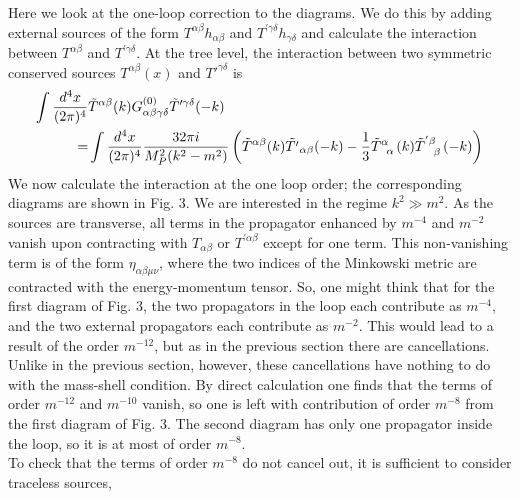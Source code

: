 \documentclass{book}
\theoremstyle{definition}
\newcommand{\nn}{\nonumber}
\newcommand{\al}{\alpha}
\newcommand{\be}{\beta}
\newcommand{\f}[2]{\frac{#1}{#2}}
\newcommand{\lp}{\left(}
\newcommand{\rp}{\right)}
\begin{document}
\begin{framed}
	Here we look at the one-loop correction to the diagrams. We do this by adding external sources of the form $T^{\al\be}h_{\al\be}$ and $T^{'\gamma\delta}h_{\gamma\delta}$ and calculate the interaction between $T^{\al\be}$ and $T^{'\gamma\delta}$. At the tree level, the interaction between two symmetric conserved
	sources $T^{\al\be}(x)$ and $T'^{\gamma\delta}$ is 
	\begin{align}
	\int\f{d^4x}{(2\pi)^4}&\tilde T^{\al\beta}(k) G^{(0)}_{\al\be\gamma\delta}\tilde T'^{\gamma\delta}(-k)\nn\\
	= &\int\f{d^4x}{(2\pi)^4} \f{32\pi i}{M_P^2 (k^2 - m^2)} \lp \tilde{T}^{\al\be}(k)\tilde{T'}_{\al\be}(-k)  - \f{1}{3}\tensor{\tilde{T}}{^\al_\al}(k)\tensor{\tilde{T}}{^{'\be}_\be}(-k)\rp
	\end{align} 
	We now calculate the interaction at the one loop order; the corresponding diagrams are shown in Fig. 3. We are interested in the regime $k^2 \gg m^2$. As the sources are transverse, all terms in the propagator enhanced by
	$m^{-4}$ and $m^{-2}$ vanish upon contracting with $T_{\al\be}$ or $T^{'\al\be}$ except for one term.
	This non-vanishing term is of the form $\eta_{\al\be\mu\nu}$, where the two indices of
	the Minkowski metric are contracted with the energy-momentum tensor. So, one might think that for the first diagram of Fig. 3, the two propagators
	in the loop each contribute as $m^{-4}$, and the two external propagators each contribute as $m^{-2}$. This would lead to a result of the order $m^{-12}$, but as in the previous section there are cancellations. Unlike in the previous section, however, these cancellations have nothing to do with the mass-shell condition. By direct calculation one finds that the terms of order $m^{-12}$ and
	$m^{-10}$ vanish, so one is left with contribution of order $m^{-8}$ from the first diagram of Fig. 3. The second diagram has only one propagator inside the
	loop, so it is at most of order $m^{-8}$.\\
	
	To check that the terms of order $m^{-8}$ do not cancel out, it is sufficient to consider traceless sources,


\end{framed}
\end{document}

